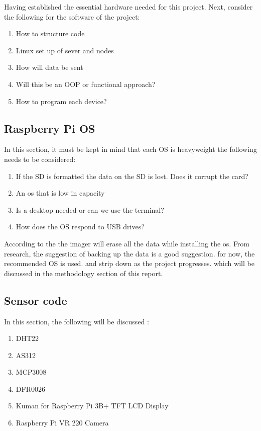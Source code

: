 
Having established the essential hardware needed for this project. Next, consider the following  for the software of the  project:
	\begin{enumerate}
	    \item How to structure code 
	    \item Linux set up of sever and nodes
	    \item How will data be sent
	    \item Will this be an OOP or functional approach?
	    \item How to program each device?
	\end{enumerate}
	\subsection{Raspberry Pi OS}
	\label{pi os}
	In this section, it must be kept in mind  that each OS is  heavyweight the following needs to be considered:
	\begin{enumerate}
		\item If the SD is formatted the data on the SD is lost. Does it corrupt the card?
		\item An os that is low in capacity 
		\item Is a desktop needed or can we use the terminal?
		\item How does the OS  respond to USB drives?
	\end{enumerate}

	According to the \cite{projects} the imager will erase all the data while installing the os. From research, the suggestion of backing up the data is a good suggestion.
	for now, the recommended OS is used. and  strip down as the project progresses. which will be discussed in the methodology section of this report.
	
	\subsection{Sensor code}
	In this section, the following will be discussed :
	\begin{enumerate}
		\item DHT22
		\item AS312
		\item MCP3008
		\item DFR0026
		\item Kuman for Raspberry Pi 3B+ TFT LCD Display
		\item Raspberry Pi VR 220 Camera 
	\end{enumerate}

